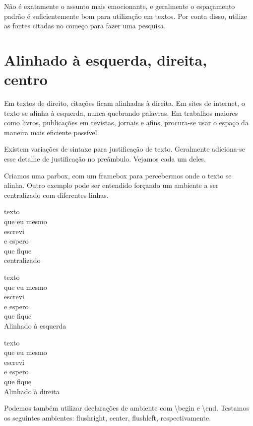 Não é exatamente o assunto mais emocionante, e geralmente o espaçamento padrão é suficientemente bom para utilização em textos.
Por conta disso, utilize as fontes citadas no começo para fazer uma pesquisa.


\section{Alinhado à esquerda, direita, centro}
Em textos de direito, citações ficam alinhadas à direita.
Em sites de internet, o texto se alinha à esquerda, nunca quebrando palavras.
Em trabalhos maiores como livros, publicações em revistas,
jornais e afins, procura-se usar o espaço da maneira mais eficiente possível.

Existem variações de sintaxe para justificação de texto.
Geralmente adiciona-se esse detalhe de justificação no preâmbulo.
Vejamos cada um deles.


Criamos uma parbox, com um framebox para percebermos onde o texto se alinha.
Outro exemplo pode ser entendido forçando um ambiente a ser centralizado com diferentes linhas.

{\centering
	texto \\
	que eu mesmo\\
	escrevi\\
	e espero\\
	que fique\\
	centralizado\\
}

{\raggedright
	texto \\
	que eu mesmo\\
	escrevi\\
	e espero\\
	que fique\\
	Alinhado à esquerda\\
}

{\raggedleft
	texto \\
	que eu mesmo\\
	escrevi\\
	e espero\\
	que fique\\
	Alinhado à direita\\
}

Podemos também utilizar declarações de ambiente com \textbackslash begin e \textbackslash end.
Testamos os seguintes ambientes: flushright, center, flushleft, respectivamente.

